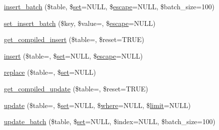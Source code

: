\begin{DoxyCompactItemize}
\item 
\mbox{\hyperlink{class_c_i___d_b__query__builder_ac35c8959b57eb08416e09c094371aaca}{insert\+\_\+batch}} (\$table, \$\mbox{\hyperlink{class_c_i___d_b__query__builder_a1589c46344f3a216a129cf65659b117c}{set}}=N\+U\+LL, \$\mbox{\hyperlink{class_c_i___d_b__driver_ac8f37ca5703d4558c732e692194f8cd6}{escape}}=N\+U\+LL, \$batch\+\_\+size=100)
\item 
\mbox{\hyperlink{class_c_i___d_b__query__builder_a810cdf264ad4b8df2c02c59ad3197859}{set\+\_\+insert\+\_\+batch}} (\$key, \$value=\textquotesingle{}\textquotesingle{}, \$\mbox{\hyperlink{class_c_i___d_b__driver_ac8f37ca5703d4558c732e692194f8cd6}{escape}}=N\+U\+LL)
\item 
\mbox{\hyperlink{class_c_i___d_b__query__builder_a09abce3658cfaba8d8a148c91a9be0ea}{get\+\_\+compiled\+\_\+insert}} (\$table=\textquotesingle{}\textquotesingle{}, \$reset=T\+R\+UE)
\item 
\mbox{\hyperlink{class_c_i___d_b__query__builder_a487027d8e320a1ea657af2d7e61df389}{insert}} (\$table=\textquotesingle{}\textquotesingle{}, \$\mbox{\hyperlink{class_c_i___d_b__query__builder_a1589c46344f3a216a129cf65659b117c}{set}}=N\+U\+LL, \$\mbox{\hyperlink{class_c_i___d_b__driver_ac8f37ca5703d4558c732e692194f8cd6}{escape}}=N\+U\+LL)
\item 
\mbox{\hyperlink{class_c_i___d_b__query__builder_a9571a23501fb4dc9e724a06bcb78dc9a}{replace}} (\$table=\textquotesingle{}\textquotesingle{}, \$\mbox{\hyperlink{class_c_i___d_b__query__builder_a1589c46344f3a216a129cf65659b117c}{set}}=N\+U\+LL)
\item 
\mbox{\hyperlink{class_c_i___d_b__query__builder_a77fb150224714405067df7c300c317b0}{get\+\_\+compiled\+\_\+update}} (\$table=\textquotesingle{}\textquotesingle{}, \$reset=T\+R\+UE)
\item 
\mbox{\hyperlink{class_c_i___d_b__query__builder_a130a26da2dd4e4582ee18f42d71fe6e4}{update}} (\$table=\textquotesingle{}\textquotesingle{}, \$\mbox{\hyperlink{class_c_i___d_b__query__builder_a1589c46344f3a216a129cf65659b117c}{set}}=N\+U\+LL, \$\mbox{\hyperlink{class_c_i___d_b__query__builder_a2356c4b7b93fb83c62a354a8a0748222}{where}}=N\+U\+LL, \$\mbox{\hyperlink{class_c_i___d_b__query__builder_a875b0d4703f176c36e771d728a9a04a0}{limit}}=N\+U\+LL)
\item 
\mbox{\hyperlink{class_c_i___d_b__query__builder_a718928dc54d935761439538836f1e70d}{update\+\_\+batch}} (\$table, \$\mbox{\hyperlink{class_c_i___d_b__query__builder_a1589c46344f3a216a129cf65659b117c}{set}}=N\+U\+LL, \$index=N\+U\+LL, \$batch\+\_\+size=100)

\end{DoxyCompactItemize}
